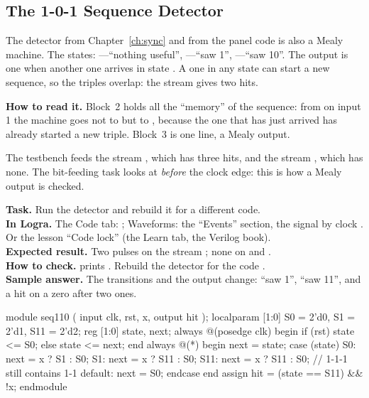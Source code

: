 \subsection{The 1-0-1 Sequence Detector}

The detector from Chapter~\ref{ch:sync} and from the panel code is also a Mealy
machine. The states: ---``nothing useful'', ---``saw 1'',
---``saw 10''. The output  is one when another one arrives
in state . A one in any state can start a new sequence, so the
triples overlap: the stream  gives two hits.


\textbf{How to read it.} Block~2 holds all the ``memory'' of the sequence: from
 on input 1 the machine goes not to  but to , because
the one that has just arrived has already started a new triple. Block~3 is one
line, a Mealy output.

The testbench  feeds the stream , which
has three hits, and the stream , which has none. The
bit-feeding task  looks at  \emph{before} the clock edge:
this is how a Mealy output is checked.

\begin{diybox}
\textbf{Task.} Run the detector and rebuild it for a different code.\\
\textbf{In Logra.} The Code tab: ; Waveforms: the ``Events''
section, the signal  by clock . Or the lesson ``Code
lock'' (the Learn tab, the Verilog book).\\
\textbf{Expected result.} Two  pulses on the stream ; none
on  and .\\
\textbf{How to check.}  prints .
 Rebuild the detector for the code .\\
\textbf{Sample answer.} The transitions and the output change: ``saw 1'', ``saw
11'', and a hit on a zero after two ones.
\end{diybox}

\begin{vcode}
module seq110 (
    input  clk, rst, x,
    output hit
);
    localparam [1:0] S0 = 2'd0, S1 = 2'd1, S11 = 2'd2;
    reg [1:0] state, next;
    always @(posedge clk) begin
        if (rst) state <= S0;
        else     state <= next;
    end
    always @(*) begin
        next = state;
        case (state)
            S0:      next = x ? S1 : S0;
            S1:      next = x ? S11 : S0;
            S11:     next = x ? S11 : S0;   // 1-1-1 still contains 1-1
            default: next = S0;
        endcase
    end
    assign hit = (state == S11) && !x;
endmodule
\end{vcode}


